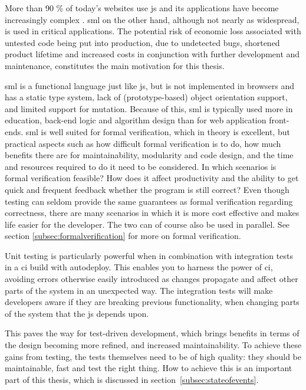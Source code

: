 \documentclass[11pt]{article}
\begin{document}
More than 90 \% of today's websites use \gls{js} \cite{BusinessJavascript} and its applications have become increasingly complex \cite[question~23]{Ekelof}. \gls{sml} on the other hand, although not nearly as widespread, is used in critical applications. The potential risk of economic loss associated with untested code being put into production, due to undetected bugs, shortened product lifetime and increased costs in conjunction with further development and maintenance, constitutes the main motivation for this thesis.

\Gls{sml} is a functional language just like \gls{js}, but is not implemented in browsers and has a static type system, lack of (prototype-based) object orientation support, and limited support for mutation. Because of this, \gls{sml} is typically used more in education, back-end logic and algorithm design than for web application front-ends. \Gls{sml} is well suited for formal verification, which in theory is excellent, but practical aspects such as how difficult formal verification is to do, how much benefits there are for maintainability, modularity and code design, and the time and resources required to do it need to be considered. In which scenarios is formal verification feasible? How does it affect productivity and the ability to get quick and frequent feedback whether the program is still correct? Even though testing can seldom provide the same guarantees as formal verification regarding correctness, there are many scenarios in which it is more cost effective and makes life easier for the developer. The two can of course also be used in parallel. See section \ref{subsec:formalverification} for more on formal verification.

Unit testing is particularly powerful when in combination with integration tests in a \gls{ci} build with \gls{autodeploy}.
This enables you to harness the power of \gls{ci}, avoiding errors otherwise easily introduced as changes propagate and affect other parts of the system in an unexpected way. The integration tests will make developers aware if they are breaking previous functionality, when changing parts of the system that the \gls{js} depends upon.

This paves the way for test-driven development, which brings benefits in terms of the design becoming more refined, and increased maintainability. To achieve these gains from testing, the tests themselves need to be of high quality: they should be maintainable, fast and test the right thing. How to achieve this is an important part of this thesis, which is discussed in section~\ref{subsec:stateofevents}.
\end{document}
